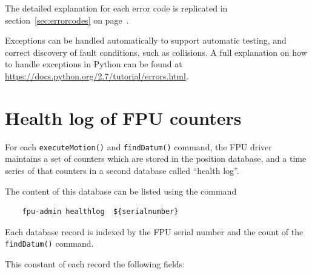 \documentclass[11pt,a4paper]{report}
\begin{document}
The detailed explanation for each error code is replicated in
section~\ref{sec:errorcodes} on page~\pageref{sec:errorcodes}.

Exceptions can be handled automatically to support automatic
testing, and correct discovery of fault conditions, such as
collisions. A full explanation on how to handle exceptions in Python can
be found at \url{https://docs.python.org/2.7/tutorial/errors.html}.

\section{Health log of FPU counters}
\label{sec:healthlog}

For each \texttt{executeMotion()} and \texttt{findDatum()} command,
the FPU driver maintains a set of counters which are stored in the
position database, and a time series of that counters in a second
database called ``health log''.

The content of this database can be listed using the command

\begin{verbatim}
    fpu-admin healthlog  ${serialnumber}
\end{verbatim}

Each database record is indexed by the FPU serial number and the count
of the \texttt{findDatum()} command.

This constant of each record the following fields:
\end{document}

